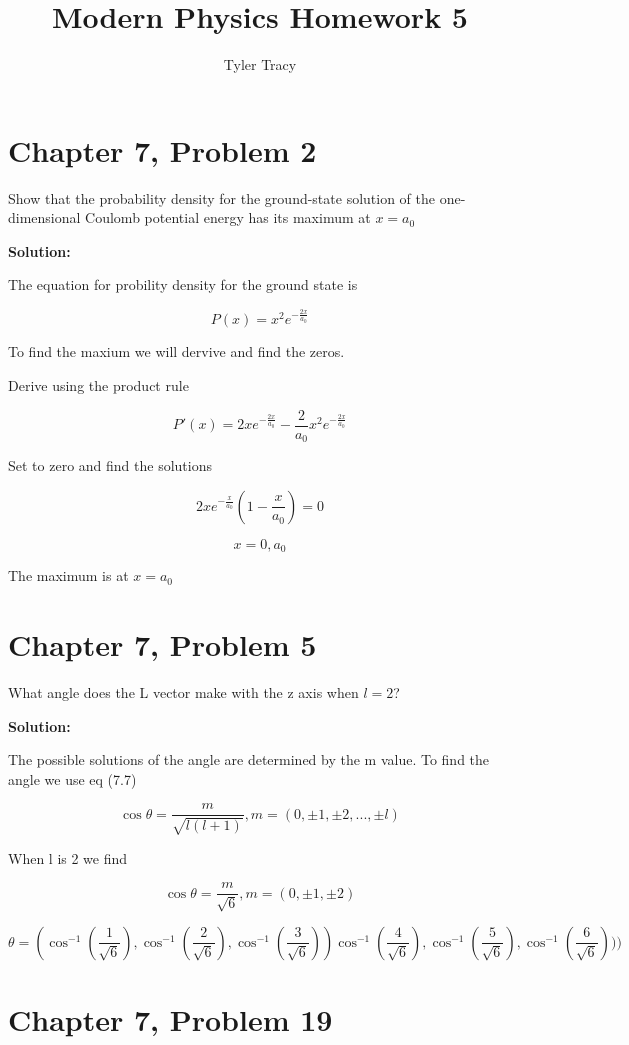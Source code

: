 \documentclass[12pt]{article}
\title{Modern Physics Homework 5}
\author{Tyler Tracy}
\begin{document}
\maketitle


\section{Chapter 7, Problem 2}

Show that the probability density for the ground-state solution of the one-dimensional Coulomb potential energy has its maximum at $x = a_0$

\textbf{Solution:}

The equation for probility density for the ground state is 

$$ P(x) = x^2 e^{-\frac{2x}{a_0}} $$

To find the maxium we will dervive and find the zeros.

Derive using the product rule

$$ P'(x) = 2xe^{-\frac{2x}{a_0}} - \frac{2}{a_0}x^2e^{-\frac{2x}{a_0}} $$

Set to zero and find the solutions

$$ 2xe^{-\frac{x}{a_0}}(1 - \frac{x}{a_0}) = 0$$

$$ x = 0, a_0 $$

The maximum is at $x = a_0$




\section{Chapter 7, Problem 5}

What angle does the L vector make with the z axis when $l = 2$?

\textbf{Solution:}

The possible solutions of the angle are determined by the m value. 
To find the angle we use eq (7.7)

$$ \cos \theta = \frac{m}{\sqrt{l(l+1)}}, m = (0, \pm1, \pm2, ..., \pm l) $$

When l is 2 we find

$$ \cos \theta = \frac{m}{\sqrt{6}}, m = (0, \pm1, \pm2) $$


$$ \theta = (
  \cos^{-1}(\frac{1}{\sqrt{6}}),
  \cos^{-1}(\frac{2}{\sqrt{6}}),
  \cos^{-1}(\frac{3}{\sqrt{6}}))
  \cos^{-1}(\frac{4}{\sqrt{6}}),
  \cos^{-1}(\frac{5}{\sqrt{6}}),
  \cos^{-1}(\frac{6}{\sqrt{6}}))
) $$

\section{Chapter 7, Problem 19}
\end{document}
